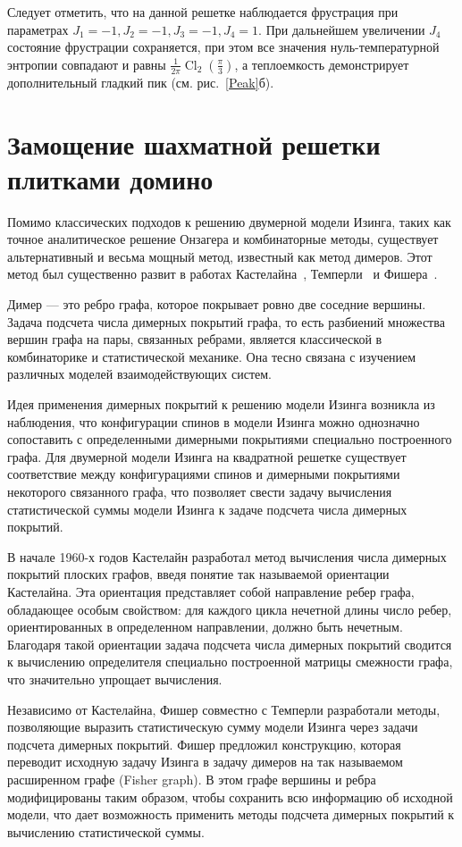 \documentclass[utf8,12pt]{jetp}
\DeclareMathOperator{\Cl}{Cl}
\begin{document}
Следует отметить, что на данной решетке наблюдается фрустрация при параметрах $J_1 = -1, J_2 =-1, J_3 = -1, J_4 = 1$. При дальнейшем увеличении $J_4$ состояние фрустрации сохраняется, при этом все значения нуль-температурной энтропии совпадают и равны $\frac{1}{2\pi} \Cl_2 (\frac{\pi}{3})$, а теплоемкость демонстрирует дополнительный гладкий пик (см. рис.~\ref{Peak}б).

\section{Замощение шахматной решетки плитками домино}

Помимо классических подходов к решению двумерной модели Изинга, таких как точное аналитическое решение Онзагера и комбинаторные методы, существует альтернативный и весьма мощный метод, известный как метод димеров. Этот метод был существенно развит в работах Кастелайна~\cite{kasteleyn1961, kasteleyn1963_1, kasteleyn1963_2}, Темперли~\cite{temperley1961} и Фишера~\cite{fisher1966}.

Димер — это ребро графа, которое покрывает ровно две соседние вершины. Задача подсчета числа димерных покрытий графа, то есть разбиений множества вершин графа на пары, связанных ребрами, является классической в комбинаторике и статистической механике. Она тесно связана с изучением различных моделей взаимодействующих систем.

Идея применения димерных покрытий к решению модели Изинга возникла из наблюдения, что конфигурации спинов в модели Изинга можно однозначно сопоставить с определенными димерными покрытиями специально построенного графа. Для двумерной модели Изинга на квадратной решетке существует соответствие между конфигурациями спинов и димерными покрытиями некоторого связанного графа, что позволяет свести задачу вычисления статистической суммы модели Изинга к задаче подсчета числа димерных покрытий.

В начале 1960-х годов Кастелайн разработал метод вычисления числа димерных покрытий плоских графов, введя понятие так называемой ориентации Кастелайна. Эта ориентация представляет собой направление ребер графа, обладающее особым свойством: для каждого цикла нечетной длины число ребер, ориентированных в определенном направлении, должно быть нечетным. Благодаря такой ориентации задача подсчета числа димерных покрытий сводится к вычислению определителя специально построенной матрицы смежности графа, что значительно упрощает вычисления.

Независимо от Кастелайна, Фишер совместно с Темперли разработали методы, позволяющие выразить статистическую сумму модели Изинга через задачи подсчета димерных покрытий. Фишер предложил конструкцию, которая переводит исходную задачу Изинга в задачу димеров на так называемом расширенном графе (Fisher graph). В этом графе вершины и ребра модифицированы таким образом, чтобы сохранить всю информацию об исходной модели, что дает возможность применить методы подсчета димерных покрытий к вычислению статистической суммы.
\end{document}
